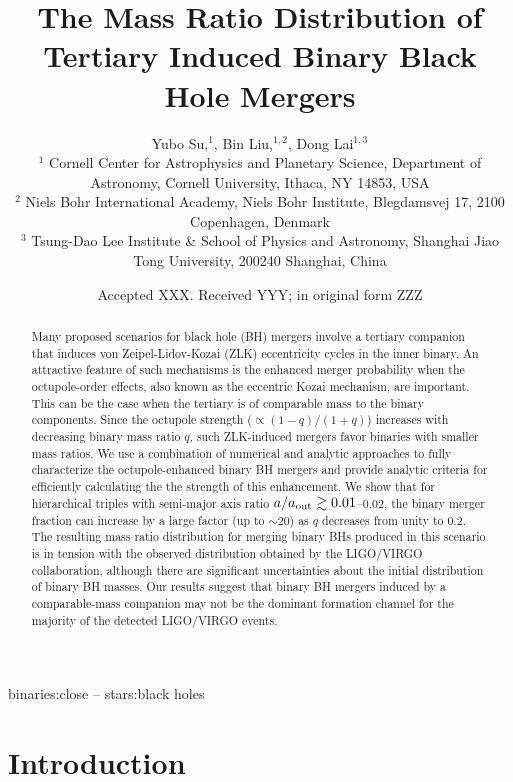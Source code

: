 \documentclass[
        fleqn,
        usenatbib,
    ]{mnras}
\title[Mass Ratio Distribution]{The Mass Ratio Distribution of
Tertiary Induced Binary Black Hole Mergers}
\author[Y. Su et\ al.]{
Yubo Su,$^1$,
Bin Liu,$^{1,2}$,
Dong Lai$^{1,3}$
\\
$^1$ Cornell Center for Astrophysics and Planetary Science, Department of
Astronomy, Cornell University, Ithaca, NY 14853, USA\\
$^2$ Niels Bohr International Academy, Niels Bohr Institute, Blegdamsvej 17,
2100 Copenhagen, Denmark\\
$^3$ Tsung-Dao Lee Institute \& School of Physics and Astronomy, Shanghai Jiao
Tong University, 200240 Shanghai, China
}
\date{Accepted XXX\@. Received YYY\@; in original form ZZZ}
\begin{document}
\label{firstpage}
\pagerange{\pageref{firstpage}--\pageref{lastpage}}
\maketitle

\begin{abstract}
    Many proposed scenarios for black hole (BH) mergers involve a tertiary
    companion that induces von Zeipel-Lidov-Kozai (ZLK) eccentricity
    cycles in the inner binary. An attractive feature of such mechanisms
    is the enhanced merger probability when the octupole-order effects,
    also known as the eccentric Kozai mechanism, are important. This can
    be the case when the tertiary is of comparable mass to the binary
    components. Since the octupole strength ($\propto (1-q)/(1+q)$)
    increases with decreasing binary mass ratio $q$, such ZLK-induced
    mergers favor binaries with smaller mass ratios. We use a combination
    of numerical and analytic approaches to fully characterize the
    octupole-enhanced binary BH mergers and provide analytic criteria for
    efficiently calculating the the strength of this enhancement. We show
    that for hierarchical triples with semi-major axis ratio $a/a_{\rm
    out}\gtrsim 0.01$--$0.02$, the binary merger fraction can increase by a
    large factor (up to $\sim 20$) as $q$ decreases from unity to $0.2$.
    The resulting mass ratio distribution for merging binary BHs produced
    in this scenario is in tension with the observed distribution obtained
    by the LIGO/VIRGO collaboration, although there are significant
    uncertainties about the initial distribution of binary BH masses. Our
    results suggest that binary BH mergers induced by a comparable-mass
    companion may not be the dominant formation channel for the majority
    of the detected LIGO/VIRGO events.
\end{abstract}

\begin{keywords}
binaries:close -- stars:black holes %
\end{keywords}

\section{Introduction}\label{s:intro}
\end{document}
